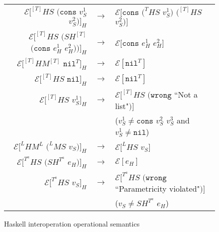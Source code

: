 \begin{figure}
\begin{center}
\begin{tabular}{rcl}
$\mathscr{E}[^{[T]}HS$ $(\mathtt{cons}$ $v_{S}^{1}$ $v_{S}^{2})]_{H}$ & $\rightarrow$ & $\mathscr{E}[\mathtt{cons}$ $(^{T}HS$ $v_{S}^{1})$ $(^{[T]}HS$ $v_{S}^{2})]$ \\
$\mathscr{E}[^{[T]}HS$ $(SH^{[T]}$ $(\mathtt{cons}$ $e_{H}^{1}$ $e_{H}^{2}))]_{H}$ & $\rightarrow$ & $\mathscr{E}[\mathtt{cons}$ $e_{H}^{1}$ $e_{H}^{2}]$ \\
$\mathscr{E}[^{[T]}HM^{[T]}$ $\mathtt{nil}^{T}]_{H}$ & $\rightarrow$ & $\mathscr{E}[\mathtt{nil}^{T}]$ \\
$\mathscr{E}[^{[T]}HS$ $\mathtt{nil}]_{H}$ & $\rightarrow$ & $\mathscr{E}[\mathtt{nil}^{T}]$ \\
$\mathscr{E}[^{[T]}HS$ $v_{S}^{1}]_{H}$ & $\rightarrow$ & $\mathscr{E}[^{[T]}HS$ $(\mathtt{wrong}$ ``Not a list"$)]$ \\
&& ($v_{S}^{1}\neq\mathtt{cons}$ $v_{S}^{2}$ $v_{S}^{3}$ and $v_{S}^{1}\neq\mathtt{nil}$) \\
$\mathscr{E}[^{L}HM^{L}$ $(^{L}MS$ $v_{S})]_{H}$ & $\rightarrow$ & $\mathscr{E}[^{L}HS$ $v_{S}]$ \\
$\mathscr{E}[^{T^{a}}HS$ $(SH^{T^{a}}$ $e_{H})]_{H}$ & $\rightarrow$ & $\mathscr{E}[e_{H}]$ \\
$\mathscr{E}[^{T^{a}}HS$ $v_{S}]_{H}$ & $\rightarrow$ & $\mathscr{E}[^{T^{a}}HS$ $(\mathtt{wrong}$ ``Parametricity violated"$)]$ \\
&& ($v_{S}\neq SH^{T^{a}}$ $e_{H}$)
\end{tabular}
\end{center}
\caption{Haskell interoperation operational semantics}
\label{fig:hios}
\end{figure}